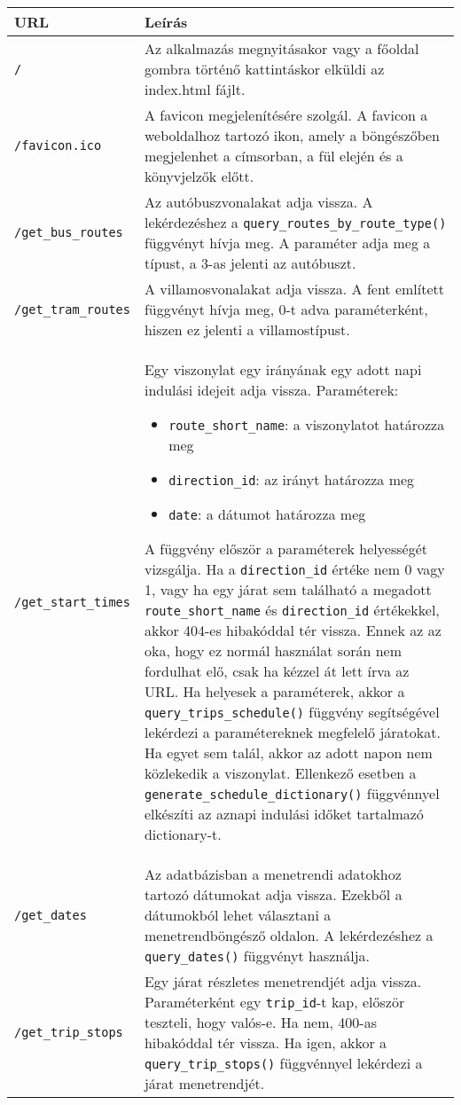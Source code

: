 \begin{longtable}{|p{4.5cm}|p{9cm}|}
\hline
\textbf{URL} & \textbf{Leírás} \\
\hline
\texttt{/} &
Az alkalmazás megnyitásakor vagy a főoldal gombra történő kattintáskor elküldi az index.html fájlt. \\
\hline
\texttt{/favicon.ico} &
A favicon megjelenítésére szolgál. A favicon a weboldalhoz tartozó ikon, amely a böngészőben megjelenhet a címsorban, a fül elején és a könyvjelzők előtt. \\
\hline
\texttt{/get\_bus\_routes} &
Az autóbuszvonalakat adja vissza. A lekérdezéshez a \texttt{query\_routes\_by\_route\_type()} függvényt hívja meg. A paraméter adja meg a típust, a 3-as jelenti az autóbuszt. \\
\hline
\texttt{/get\_tram\_routes} &
A villamosvonalakat adja vissza. A fent említett függvényt hívja meg, 0-t adva paraméterként, hiszen ez jelenti a villamostípust. \\
\hline
\texttt{/get\_start\_times} &
Egy viszonylat egy irányának egy adott napi indulási idejeit adja vissza.
Paraméterek:
\begin{itemize}
\item \texttt{route\_short\_name}: a viszonylatot határozza meg
\item \texttt{direction\_id}: az irányt határozza meg
\item \texttt{date}: a dátumot határozza meg
\end{itemize}
A függvény először a paraméterek helyességét vizsgálja. Ha a \texttt{direction\_id} értéke nem 0 vagy 1, vagy ha egy járat sem található a megadott \texttt{route\_short\_name} és \texttt{direction\_id} értékekkel, akkor 404-es hibakóddal tér vissza. Ennek az az oka, hogy ez normál használat során nem fordulhat elő, csak ha kézzel át lett írva az URL.
Ha helyesek a paraméterek, akkor a \texttt{query\_trips\_schedule()} függvény segítségével lekérdezi a paramétereknek megfelelő járatokat. Ha egyet sem talál, akkor az adott napon nem közlekedik a viszonylat. Ellenkező esetben a \texttt{generate\_schedule\_dictionary()}  függvénnyel elkészíti az aznapi indulási időket tartalmazó dictionary-t. \\
\hline
\texttt{/get\_dates} &
Az adatbázisban a menetrendi adatokhoz tartozó dátumokat adja vissza. Ezekből a dátumokból lehet választani a menetrendböngésző oldalon. A lekérdezéshez a \texttt{query\_dates()} függvényt használja.  \\
\hline
\texttt{/get\_trip\_stops} &
Egy járat részletes menetrendjét adja vissza. Paraméterként egy \texttt{trip\_id}-t kap, először teszteli, hogy valós-e. Ha nem, 400-as hibakóddal tér vissza. Ha igen, akkor a \texttt{query\_trip\_stops()} függvénnyel lekérdezi a járat menetrendjét.  \\

\end{longtable}
